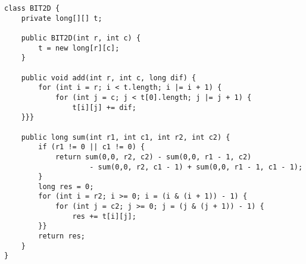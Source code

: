 \begin{verbatim}
class BIT2D {
	private long[][] t;

	public BIT2D(int r, int c) {
		t = new long[r][c];
	}

	public void add(int r, int c, long dif) {
		for (int i = r; i < t.length; i |= i + 1) {
			for (int j = c; j < t[0].length; j |= j + 1) {
				t[i][j] += dif;
	}}}

	public long sum(int r1, int c1, int r2, int c2) {
		if (r1 != 0 || c1 != 0) {
			return sum(0,0, r2, c2) - sum(0,0, r1 - 1, c2) 
					- sum(0,0, r2, c1 - 1) + sum(0,0, r1 - 1, c1 - 1);
		}
		long res = 0;
		for (int i = r2; i >= 0; i = (i & (i + 1)) - 1) {
			for (int j = c2; j >= 0; j = (j & (j + 1)) - 1) {
				res += t[i][j];
		}}
		return res;
	}
}
\end{verbatim}